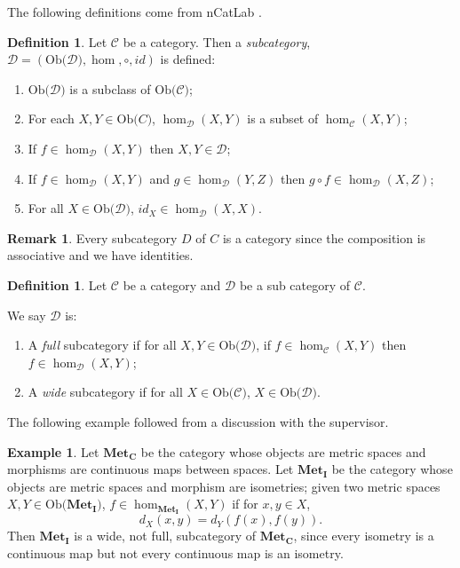 \documentclass[11pt,a4paper]{article}
\theoremstyle{definition}
\newtheorem{definition}[thm]{Definition}
\newtheorem{example}[thm]{Example}
\newtheorem{remark}[thm]{Remark}
\newcommand\ho[3][]{\hom_{#1}(#2,#3)}
\newcommand\ob[1]{\mathrm{Ob(}#1\mathrm{)}}
\newcommand\cat[1]{\mathscr{#1}}
\numberwithin{equation}{section}
\begin{document}
The following definitions come from nCatLab \cite{nLab}.
\begin{definition}
    \label{def:subcategory}
    Let $\cat{C}$ be a category. Then a \emph{subcategory}, $\cat{D}= (\ob{\cat{D}},\hom,\circ,id)$ is defined:
    \begin{enumerate}
        \item $\ob{\cat{D}}$ is a subclass of $\ob{\cat{C}}$;
        \item For each $X,Y\in\ob{C}$, $\ho[\cat{D}]{X}{Y}$ is a subset of $\ho[\cat{C}]{X}{Y}$;
        \item If $f\in\ho[\cat{D}]{X}{Y}$ then $X,Y\in\cat{D}$;
        \item If $f\in\ho[\cat{D}]{X}{Y}$ and $g\in\ho[\cat{D}]{Y}{Z}$ then $g\circ f\in\ho[\cat{D}]{X}{Z}$;
        \item For all $X\in\ob{\cat{D}}$, $id_{X}\in\ho[\cat{D}]{X}{X}$.
    \end{enumerate}
\end{definition}
\begin{remark}
    Every subcategory $D$ of $C$ is a category since the composition is associative and we have identities.
\end{remark}
\begin{definition}
    \label{def:fullwidesubcategory}
    Let $\cat{C}$ be a category and $\cat{D}$ be a sub category of $\cat{C}$.
    
    We say $\cat{D}$ is:
    \begin{enumerate}
        \item A \emph{full} subcategory if for all $X,Y\in\ob{\cat{D}}$, if $f\in\ho[\cat{C}]{X}{Y}$ then $f\in\ho[\cat{D}]{X}{Y}$;
        \item A \emph{wide} subcategory if for all $X\in\ob{\cat{C}}$, $X\in\ob{\cat{D}}$.
        \end{enumerate}
\end{definition}

The following example followed from a discussion with the supervisor.
\begin{example}
    Let $\mathbf{Met_{C}}$ be the category whose objects are metric spaces and morphisms are continuous maps between spaces. Let $\mathbf{Met_{I}}$ be the category whose objects are metric spaces and morphism are isometries; given two metric spaces $X,Y\in\ob{\mathbf{Met_{I}}}$, $f\in\ho[\mathbf{Met_{I}}]{X}{Y}$ if for $x,y\in X$,
    \[d_{X}(x,y)=d_{Y}(f(x),f(y)).\]
    Then $\mathbf{Met_{I}}$ is a wide, not full, subcategory of $\mathbf{Met_{C}}$, since every isometry is a continuous map but not every continuous map is an isometry.
\end{example}
\end{document}
